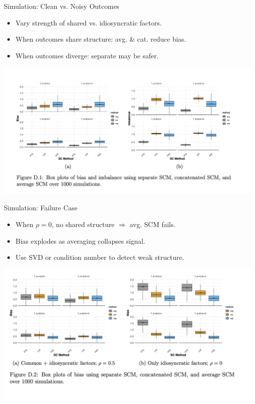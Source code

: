 \documentclass{beamer}
\begin{document}
\begin{frame}{Simulation: Clean vs. Noisy Outcomes}
  \begin{itemize}
    \item Vary strength of shared vs. idiosyncratic factors.
    \item When outcomes share structure: avg. \& cat. reduce bias.
    \item When outcomes diverge: separate may be safer.
  \end{itemize}
  \includegraphics[width=0.9\linewidth]{./lecture_includes/sim1_bias_boxplots.png}
\end{frame}

\begin{frame}{Simulation: Failure Case}
  \begin{itemize}
    \item When $\rho = 0$, no shared structure $\Rightarrow$ avg. SCM fails.
    \item Bias explodes as averaging collapses signal.
    \item Use SVD or condition number to detect weak structure.
  \end{itemize}
  \includegraphics[width=0.9\linewidth]{./lecture_includes/sim2_failure_case.png}
\end{frame}
\end{document}
